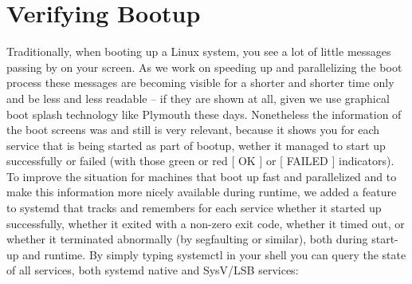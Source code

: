 \documentclass[titlepage]{article}
\begin{document}
\section{Verifying Bootup}
Traditionally, when booting up a Linux system, you see a lot of little
messages passing by on your screen. As we work on speeding up and
parallelizing the boot process these messages are becoming visible for a
shorter and shorter time only and be less and less readable -- if they are
shown at all, given we use graphical boot splash technology like Plymouth
these days. Nonetheless the information of the boot screens was and still is
very relevant, because it shows you for each service that is being started
as part of bootup, wether it managed to start up successfully or failed
(with those green or red [ OK ] or [ FAILED ] indicators). To improve the
situation for machines that boot up fast and parallelized and to make this
information more nicely available during runtime, we added a feature to
systemd that tracks and remembers for each service whether it started up
successfully, whether it exited with a non-zero exit code, whether it timed
out, or whether it terminated abnormally (by segfaulting or similar), both
during start-up and runtime. By simply typing systemctl in your shell you
can query the state of all services, both systemd native and SysV/LSB
services:
\end{document}

